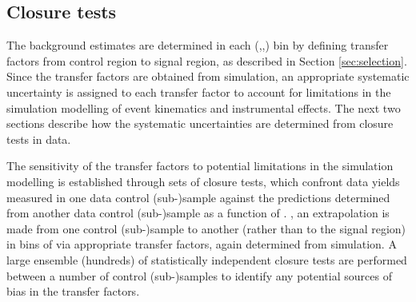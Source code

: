 %

\subsection{Closure tests}
\label{sec:closure-tests-desc}
\label{sec:bkgdnorm-syst}

The background estimates are determined in each (\nb,\njet,\scalht) bin by
defining transfer factors from control region to signal region, as
described in Section \ref{sec:selection}. Since the transfer factors
are obtained from simulation, an appropriate systematic uncertainty is
assigned to each transfer factor to account for limitations in the
simulation modelling of event kinematics and instrumental effects. The
next two sections describe how the systematic uncertainties are
determined from closure tests in data.

The sensitivity of the transfer factors to potential limitations in
the simulation modelling is established through sets of closure tests,
which confront data yields measured in one data control (sub-)sample
against the predictions determined from another data control
(sub-)sample as a function of \scalht. \ie, an extrapolation is made
from one control (sub-)sample to another (rather than to the signal
region) in bins of \scalht via appropriate transfer factors, again
determined from simulation. A large ensemble (\ie hundreds) of
statistically independent closure tests are performed between a number
of control (sub-)samples to identify any potential sources of bias in
the transfer factors.

